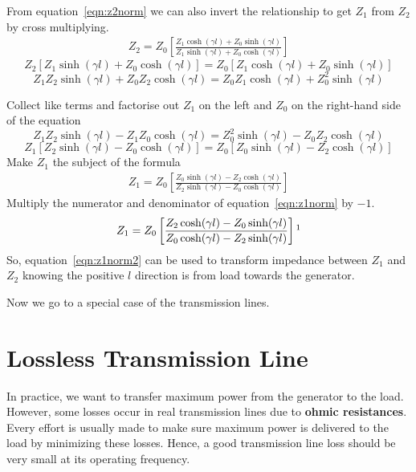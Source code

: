 From equation~\eqref{eqn:z2norm} we can also invert the relationship to get $Z_1$ from $Z_2$ by cross multiplying.
\begin{align*}
Z_2 = Z_0\left[\frac{Z_1\cosh(\gamma l) + Z_0\sinh(\gamma l)}{Z_1 \sinh(\gamma l) + Z_0 \cosh(\gamma l)}\right]
\end{align*}
\begin{dmath*}
Z_2\left[Z_1\sinh(\gamma l) + Z_0\cosh(\gamma l)\right] = Z_0\left[Z_1\cosh(\gamma l) + Z_0\sinh(\gamma l)\right]
\end{dmath*}
\[Z_1Z_2\sinh(\gamma l) + Z_0Z_2\cosh(\gamma l) = Z_0Z_1\cosh(\gamma l) + Z_0^2\sinh(\gamma l)\]

Collect like terms and factorise out $Z_1$ on the left and $Z_0$ on the right-hand side of the equation
\begin{dmath*}
Z_1Z_2\sinh(\gamma l) - Z_1Z_0\cosh(\gamma l) = Z_0^2\sinh(\gamma l) - Z_0Z_2\cosh(\gamma l)
\end{dmath*}
\begin{dmath*}
Z_1\left[Z_2\sinh(\gamma l) - Z_0\cosh(\gamma l)\right] = Z_0\left[Z_0\sinh(\gamma l) - Z_2\cosh(\gamma l)\right]
\end{dmath*}
Make $Z_1$ the subject of the formula
\begin{align}
Z_1 = Z_0\left[\frac{Z_0\sinh(\gamma l) - Z_2\cosh(\gamma l)}{Z_2\sinh(\gamma l) - Z_0\cosh(\gamma l)}\right]
\label{eqn:z1norm}
\end{align}
Multiply the numerator and denominator of equation~\eqref{eqn:z1norm} by $-1$.
\begin{equation}
Z_1 = Z_0\left[\frac{Z_2\cosh(\gamma l) - Z_0\sinh(\gamma l)}{Z_0\cosh(\gamma l) - Z_2\sinh(\gamma l)}\right]\footnotemark
\label{eqn:z1norm2}
\end{equation}
So, equation~\eqref{eqn:z1norm2} can be used to transform impedance between $Z_1$ and $Z_2$ knowing the positive $l$ direction is from load towards the generator.

Now we go to a special case of the transmission lines.

\section{Lossless Transmission Line}
In practice, we want to transfer maximum power from the generator to the load. However, some losses occur in real transmission lines due to \textbf{ohmic resistances}. Every effort is usually made to make sure maximum power is delivered to the load by minimizing these losses. Hence, a good transmission line loss should be very small at its operating frequency.

